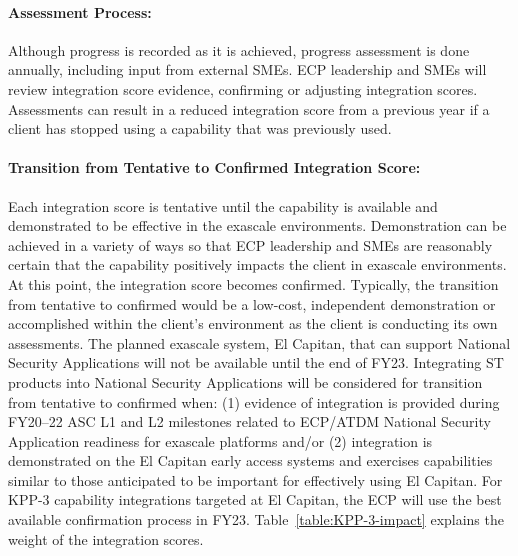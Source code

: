 \paragraph{Assessment Process:}
Although progress is recorded as it is achieved, progress assessment is done annually, including input from external SMEs.  ECP leadership and SMEs will review integration score evidence, confirming or adjusting integration scores.
Assessments can result in a reduced integration score from a previous year if a client has stopped using a capability that was previously used.

\paragraph{Transition from Tentative to Confirmed Integration Score:}
Each integration score is tentative until the capability is available and demonstrated to be effective in the exascale environments.  Demonstration can be achieved in a variety of ways so that ECP leadership and SMEs are reasonably certain that the capability positively impacts the client in exascale environments.  At this point, the integration score becomes confirmed. 
Typically, the transition from tentative to confirmed would be a low-cost, independent demonstration or accomplished within the client’s environment as the client is conducting its own assessments. 
The planned exascale system, El Capitan, that can support National Security Applications will not be available until the end of FY23. Integrating ST products into National Security Applications will be considered for transition from tentative to confirmed when: (1) evidence of integration is provided during FY20--22 ASC L1 and L2 milestones related to ECP/ATDM National Security Application readiness for exascale platforms and/or (2) integration is demonstrated on the El Capitan early access systems and exercises capabilities similar to those anticipated to be important for effectively using El Capitan.  For KPP-3 capability integrations targeted at El Capitan, the ECP will use the best available confirmation process in FY23. Table~\ref{table:KPP-3-impact} explains the weight of the integration scores. 


